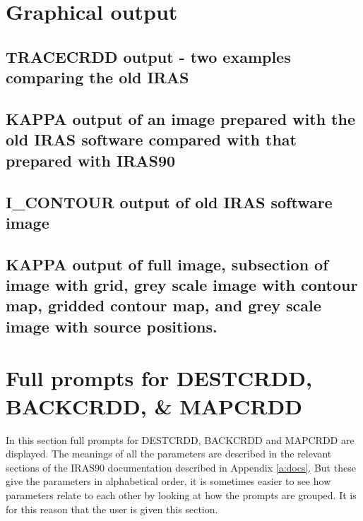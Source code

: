 \section{Graphical output}
\label{a:a}
\subsection{TRACECRDD output - two examples comparing the old IRAS
}
\label{a:a1}
\subsection{KAPPA output of an image prepared with the old IRAS software 
compared with that prepared with IRAS90}
\label{a:a2}
\subsection{I\_CONTOUR  output of old IRAS software image}
\label{a:a3}
\subsection{KAPPA output of  full image, subsection of image with grid, grey 
scale image with contour map, gridded contour map, and grey scale image with
source positions.}
\label{a:a4}

%

\newpage
\addtocounter{page}{+9}
\section{Full prompts for DESTCRDD, BACKCRDD, \& MAPCRDD}
\label{a:fulldbm}

In this section full prompts for DESTCRDD, BACKCRDD and MAPCRDD are displayed.
The meanings of all the parameters are described in the relevant sections of
the IRAS90 documentation described in Appendix \ref{a:docs}. But these give the 
parameters in alphabetical order, it is sometimes easier to see how parameters
relate to each other by looking at how the prompts are grouped. It is for this 
reason that the user is given this section.

